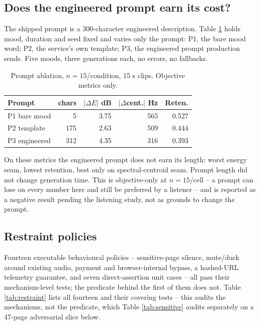 \documentclass[conference]{IEEEtran}
\let\IEEEoriginalcaption\caption
\renewcommand{\caption}[1]{\IEEEoriginalcaption{\footnotesize #1}}
\begin{document}
\subsection{Does the engineered prompt earn its cost?}
\label{sec:res-prompt}

The shipped prompt is a 300-character engineered description. Table
\ref{tab:prompt} holds mood, duration and seed fixed and varies only the
prompt: P1, the bare mood word; P2, the service's own template; P3, the
engineered prompt production sends. Five moods, three generations each,
no errors, no fallbacks.

\begin{table}[t]
\caption{Prompt ablation, $n=15$/condition, 15 s clips. Objective metrics
only.}
\label{tab:prompt}
\begin{center}
\scriptsize
\setlength{\tabcolsep}{2.5pt}
\begin{tabular}{lrrrr}
\toprule
\textbf{Prompt} & \textbf{chars} & \textbf{$|\Delta E|$ dB} & \textbf{$|\Delta$cent.$|$ Hz} & \textbf{Reten.} \\
\midrule
P1 bare mood & 5 & 3.75 & 565 & 0.527 \\
P2 template & 175 & 2.63 & 509 & 0.444 \\
P3 engineered & 312 & 4.35 & 316 & 0.393 \\
\bottomrule
\end{tabular}
\end{center}
\end{table}

On these metrics the engineered prompt does not earn its length: worst
energy seam, lowest retention, best only on spectral-centroid seam.
Prompt length did not change generation time. This is objective-only at
$n=15$/cell -- a prompt can lose on every number here and still be
preferred by a listener -- and is reported as a negative result pending
the listening study, not as grounds to change the prompt.

\subsection{Restraint policies}
\label{sec:res-audit}

Fourteen executable behavioural policies -- sensitive-page silence,
mute/duck around existing audio, payment and browser-internal bypass, a
hashed-URL telemetry guarantee, and seven direct-assertion unit cases --
all pass their mechanism-level tests; the predicate behind the first of
them does not. Table \ref{tab:restraint} lists all fourteen and their
covering tests -- this audits the mechanisms, not the predicate,
which Table \ref{tab:sensitive} audits separately on a 47-page
adversarial slice below.
\end{document}
